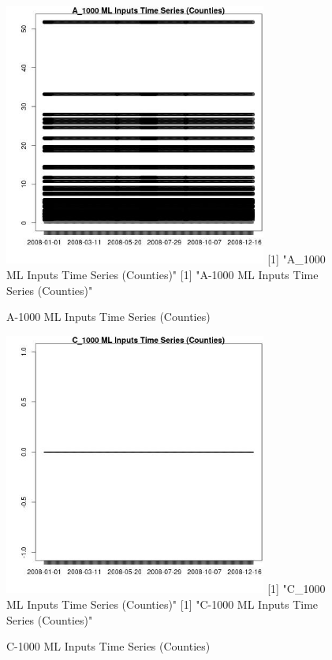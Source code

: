 \begin{figure} 
\centering  
\includegraphics[width=0.77\textwidth]{Code_Outputs/ML_input_report_ML_input_CountyGeometricCentroids_Locations_Dates_part_c_2008-01-01to2008-12-31_A_1000TS.jpg} 
[1] "A_1000 ML Inputs Time Series (Counties)"
[1] "A-1000 ML Inputs Time Series (Counties)"
\caption{\label{fig:ML_input_report_ML_input_CountyGeometricCentroids_Locations_Dates_part_c_2008-01-01to2008-12-31A_1000TS}A-1000 ML Inputs Time Series (Counties)} 
\end{figure} 
 

\begin{figure} 
\centering  
\includegraphics[width=0.77\textwidth]{Code_Outputs/ML_input_report_ML_input_CountyGeometricCentroids_Locations_Dates_part_c_2008-01-01to2008-12-31_C_1000TS.jpg} 
[1] "C_1000 ML Inputs Time Series (Counties)"
[1] "C-1000 ML Inputs Time Series (Counties)"
\caption{\label{fig:ML_input_report_ML_input_CountyGeometricCentroids_Locations_Dates_part_c_2008-01-01to2008-12-31C_1000TS}C-1000 ML Inputs Time Series (Counties)} 
\end{figure} 
 

